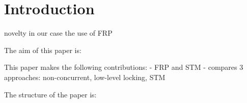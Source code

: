 \section{Introduction}
novelty in our case the use of FRP

The aim of this paper is: 

This paper makes the following contributions:
- FRP and STM
- compares 3 approaches: non-concurrent, low-level locking, STM

The structure of the paper is: